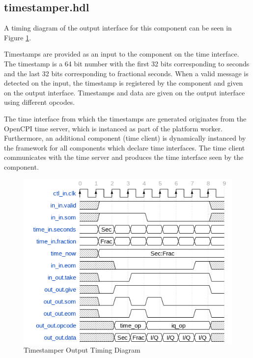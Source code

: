 \documentclass{article}
\def\comp{timestamper}
\begin{document}
\subsection*{\comp.hdl}
\begin{flushleft}
	A timing diagram of the output interface for this component can be seen in Figure \ref{fig:timestamper_timing_diagram}.\par\bigskip
	\noindent Timestamps are provided as an input to the component on the time interface. The timestamp is a 64 bit number with the first 32 bits corresponding to seconds and the last 32 bits corresponding to fractional seconds. When a valid message is detected on the input, the timestamp is registered by the component and given on the output interface. Timestamps and data are given on the output interface using different opcodes.\par\bigskip
	The time interface from which the timestamps are generated originates from the OpenCPI time server, which is instanced as part of the platform worker. Furthermore, an additional component (time client) is dynamically instanced by the framework for all components which declare time interfaces. The time client communicates with the time server and produces the time interface seen by the component.
\end{flushleft}
\begin{figure}[h]
	\centering
	\includegraphics[scale=0.6]{timestamper_timing_diagram}
	\caption{Timestamper Output Timing Diagram}
	\label{fig:timestamper_timing_diagram}
\end{figure}
\end{document}
